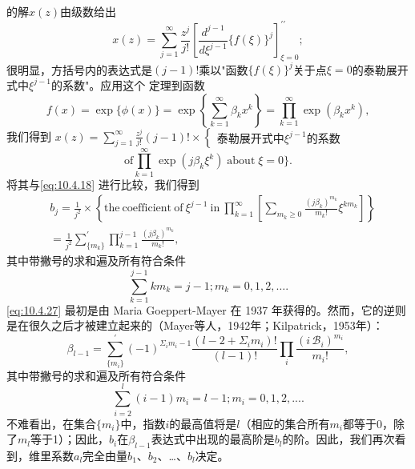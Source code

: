 的解\(x(z)\)由级数给出
\begin{equation}\tag{10.4.24}\label{eq:10.4.24}
x ( z ) = \sum _ { j = 1 } ^{\infty} \frac { z ^{j} } { j ! } \left[ \frac { d ^{j - 1} } { d \xi ^{j - 1} } \{ f ( \xi ) \} ^{j} \right] _ { \xi = 0 } ^{\prime \prime} ;
\end{equation}
很明显，方括号内的表达式是\((j-1)!\)乘以"函数\(\{f(\xi)\}^{j}\)关于点\(\xi=0\)的泰勒展开式中\(\xi^{j-1}\)的系数"。应用这个
定理到函数
\begin{equation}\tag{10.4.25}\label{eq:10.4.25}
f ( x ) = \exp \{ \phi ( x ) \} = \exp \left\{ \sum _ { k = 1 } ^{\infty} \beta _ { k } x ^{k} \right\} = \prod _ { k = 1 } ^{\infty} \exp ( \beta _ { k } x ^{k} ) ,
\end{equation}
我们得到
\(x(z)=\sum_{j=1}^{\infty}\frac{z^{j}}{j!}(j-1)!\times\begin{cases}\text{泰勒展开式中}\xi^{j-1}\text{的系数}\end{cases}\)
\begin{equation}\tag{10.4.26}\label{eq:10.4.26}
\mathrm { o f } \prod _ { k = 1 } ^{\infty} \exp ( j \beta _ { k } \xi ^{k} ) \; \mathrm { a b o u t } \; \xi = 0 \biggr \} .
\end{equation}
将其与\autoref{eq:10.4.18} 进行比较，我们得到
\begin{equation}\tag{10.4.27}\label{eq:10.4.27}
\begin{array}{rl} & { b _ { j } = \frac { 1 } { j ^{2} } \times \left\{ \mathrm { t h e ~ c o e f f i c i e n t ~ o f ~ } \xi ^{j - 1} \mathrm { ~ i n ~ } \prod _ { k = 1 } ^{\infty} \left[ \sum _ { m _ { k } \geq 0 } \frac { ( j \beta _ { k } ) ^{m _ { k} } } { m _ { k } ! } \xi ^{k m _ { k} } \right] \right\} } \\& { = \frac { 1 } { j ^{2} } \sum _ { \{ m _ { k } \} } ^{\prime} \prod _ { k = 1 } ^{j - 1} \frac { ( j \beta _ { k } ) ^{m _ { k} } } { m _ { k } ! } , } \end{array}
\end{equation}
其中带撇号的求和遍及所有符合条件
\begin{equation}\tag{10.4.28}\label{eq:10.4.28}
\sum _ { k = 1 } ^{j - 1} k m _ { k } = j - 1 ;  m _ { k } = 0 , 1 , 2 , \ldots .
\end{equation}
\autoref{eq:10.4.27} 最初是由 Maria Goeppert-Mayer 在 1937 年获得的。然而，它的逆则是在很久之后才被建立起来的（Mayer等人，1942年；Kilpatrick，1953年）：
\begin{equation}\tag{10.4.29}\label{eq:10.4.29}
\beta _ { l - 1 } = \sum _ { \{ m _ { i } \} } ^{\prime} ( - 1 ) ^{\Sigma _ { i} m _ { i } - 1 } \frac { ( l - 2 + \Sigma _ { i } m _ { i } ) ! } { ( l - 1 ) ! } \prod _ { i } \frac { ( i \, \mathcal { B } _ { i } ) ^{m _ { i} } } { m _ { i } ! } ,
\end{equation}
其中带撇号的求和遍及所有符合条件
\begin{equation}\tag{10.4.30}\label{eq:10.4.30}
\sum _ { i = 2 } ^{l} ( i - 1 ) m _ { i } = l - 1 ;  m _ { i } = 0 , 1 , 2 , . . . .
\end{equation}
不难看出，在集合\(\{m_i\}\)中，指数\(i\)的最高值将是\(l\)（相应的集合所有\(m_i\)都等于0，除了\(m_l\)等于1）；因此，\(b_i\)在\(\beta_{l-1}\)表达式中出现的最高阶是\(b_l\)的阶。因此，我们再次看到，维里系数\(a_l\)完全由量\(b_1\)、\(b_2\)、\ldots、\(b_l\)决定。
